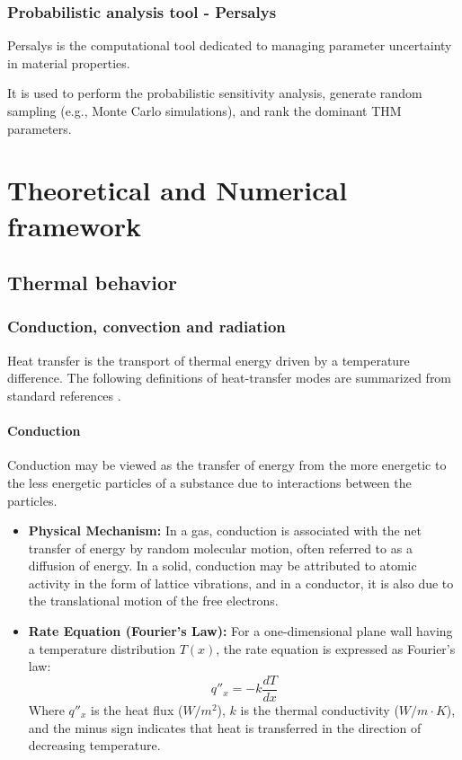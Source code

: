 \documentclass[a4paper,12pt,twoside]{report}     %
\begin{document}
\subsection{Probabilistic analysis tool - Persalys}
Persalys is the computational tool dedicated to managing parameter uncertainty in material properties.

It is used to perform the probabilistic sensitivity analysis, generate random sampling (e.g., Monte Carlo simulations), and rank the dominant THM parameters.


\cleardoublepage
\chapter{Theoretical and Numerical framework}


\section{Thermal behavior}

\subsection{Conduction, convection and radiation}
Heat transfer is the transport of thermal energy driven by a temperature difference. The following definitions of heat-transfer modes are summarized from standard references \cite{bergman_introduction_2017}.


\subsubsection{Conduction}
Conduction may be viewed as the transfer of energy from the more energetic to the less energetic particles of a substance due to interactions between the particles.
\begin{itemize}
    \item \textbf{Physical Mechanism:} In a gas, conduction is associated with the net transfer of energy by random molecular motion, often referred to as a diffusion of energy. In a solid, conduction may be attributed to atomic activity in the form of lattice vibrations, and in a conductor, it is also due to the translational motion of the free electrons.
    \item \textbf{Rate Equation (Fourier's Law):} For a one-dimensional plane wall having a temperature distribution $T(x)$, the rate equation is expressed as Fourier's law:
    \begin{equation}
        q''_x = -k \frac{dT}{dx}
    \end{equation}
    Where $q''_x$ is the heat flux ($W/m^2$), $k$ is the thermal conductivity ($W/m \cdot K$), and the minus sign indicates that heat is transferred in the direction of decreasing temperature.
\end{itemize}
\end{document}
